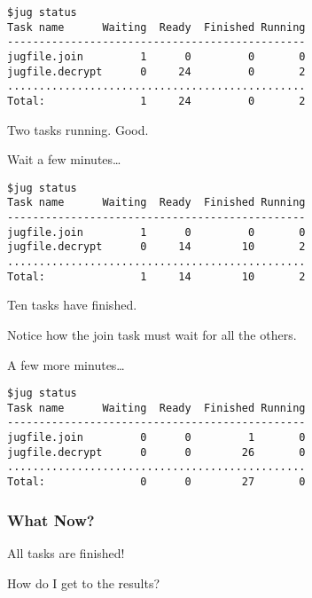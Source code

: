 \documentclass{beamer}
\begin{document}
\begin{frame}[fragile]
\begin{verbatim}
$jug status
Task name      Waiting  Ready  Finished Running
-----------------------------------------------
jugfile.join         1      0         0       0
jugfile.decrypt      0     24         0       2
...............................................
Total:               1     24         0       2

\end{verbatim}

Two tasks running. Good.
\end{frame}

\begin{frame}[fragile]
Wait a few minutes\dots
\end{frame}

\begin{frame}[fragile]
\begin{verbatim}
$jug status
Task name      Waiting  Ready  Finished Running
-----------------------------------------------
jugfile.join         1      0         0       0
jugfile.decrypt      0     14        10       2
...............................................
Total:               1     14        10       2
\end{verbatim}

Ten tasks have finished.

Notice how the \alert{join} task must wait for all the others.
\end{frame}

\begin{frame}[fragile]
A few more minutes\dots
\end{frame}

\begin{frame}[fragile]
\begin{verbatim}
$jug status
Task name      Waiting  Ready  Finished Running
-----------------------------------------------
jugfile.join         0      0         1       0
jugfile.decrypt      0      0        26       0
...............................................
Total:               0      0        27       0
\end{verbatim}
\end{frame}

\begin{frame}[fragile]
\frametitle{What Now?}

All tasks are finished!

How do I get to the results?
\end{frame} 
\end{document}
